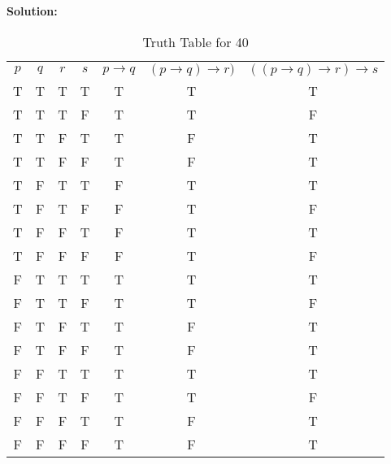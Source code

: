 \documentclass{Axon}
\begin{document}
\noindent
\textbf{Solution:}
\begin{table}[ht]
    \centering
    \begin{tabular}{c|c|c|c|c|c|c}
    \(p\) & \(q\) & \(r\) & \(s\) & \(p \to q\) & \((p \to q) \to r)\) & \(((p \to q) \to r) \to s\) \\
    T     & T     & T     & T     & T           & T                    & T                           \\
    T     & T     & T     & F     & T           & T                    & F                           \\
    T     & T     & F     & T     & T           & F                    & T                           \\
    T     & T     & F     & F     & T           & F                    & T                           \\
    T     & F     & T     & T     & F           & T                    & T                           \\
    T     & F     & T     & F     & F           & T                    & F                           \\
    T     & F     & F     & T     & F           & T                    & T                           \\
    T     & F     & F     & F     & F           & T                    & F                           \\
    F     & T     & T     & T     & T           & T                    & T                           \\
    F     & T     & T     & F     & T           & T                    & F                           \\
    F     & T     & F     & T     & T           & F                    & T                           \\
    F     & T     & F     & F     & T           & F                    & T                           \\
    F     & F     & T     & T     & T           & T                    & T                           \\
    F     & F     & T     & F     & T           & T                    & F                           \\
    F     & F     & F     & T     & T           & F                    & T                           \\
    F     & F     & F     & F     & T           & F                    & T
    \end{tabular}
    \caption{Truth Table for 40}
\end{table}
\end{document}
